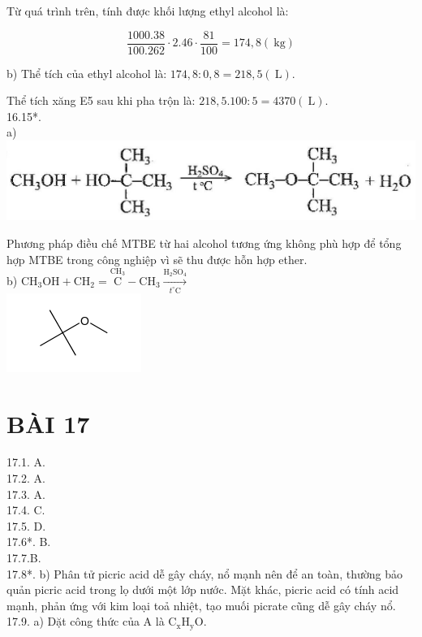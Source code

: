 \documentclass[10pt]{article}
\begin{document}
Từ quá trình trên, tính được khối lượng ethyl alcohol là:

$$
\frac{1000.38}{100.262} \cdot 2.46 \cdot \frac{81}{100}=174,8(\mathrm{~kg})
$$

b) Thể tích của ethyl alcohol là: $174,8: 0,8=218,5(\mathrm{~L})$.

Thể tích xăng E5 sau khi pha trộn là: $218,5.100: 5=4370(\mathrm{~L})$.\\
16.15*.\\
a)\\
\includegraphics[max width=\textwidth, center]{2025_10_23_052d3249fabea90c1e95g-25}

Phương pháp điều chế MTBE từ hai alcohol tương ứng không phù hợp để tổng hợp MTBE trong công nghiệp vì sẽ thu được hỗn hợp ether.\\
b) $\mathrm{CH}_{3} \mathrm{OH}+\mathrm{CH}_{2}=\stackrel{\mathrm{CH}_{3}}{\mathrm{C}}-\mathrm{CH}_{3} \xrightarrow[t^{\circ} \mathrm{C}]{\mathrm{H}_{2} \mathrm{SO}_{4}}$\\
\includegraphics{smile-ce3e0712c8b69812f5f7396086f10f6812bf7cf3}

\section*{BÀI 17}
17.1. A.\\
17.2. A.\\
17.3. A.\\
17.4. C.\\
17.5. D.\\
17.6*. B.\\
17.7.B.\\
17.8*. b) Phân tử picric acid dễ gây cháy, nổ mạnh nên để an toàn, thường bảo quản picric acid trong lọ dưới một lớp nước. Mặt khác, picric acid có tính acid mạnh, phản ứng với kim loại toả nhiệt, tạo muối picrate cũng dễ gây cháy nổ.\\
17.9. a) Dặt công thức của A là $\mathrm{C}_{\mathrm{x}} \mathrm{H}_{\mathrm{y}} \mathrm{O}$.
\end{document}
